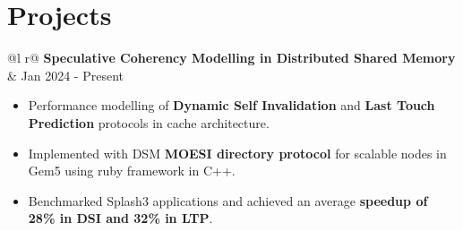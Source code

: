 \documentclass[a4paper,10pt]{article}
\begin{document}
\vspace{-0.1cm}
\section{Projects}

\begin{tabularx}{\linewidth}{ @{}l r@{} }
    \textbf{Speculative Coherency Modelling in Distributed Shared Memory} & \hfill {\small Jan 2024 - Present} \\[2.75pt]
    {
        \begin{minipage}[t]{\linewidth}
            \begin{itemize}[nosep,after=\strut, leftmargin=2em, itemsep=3pt]
                \item Performance modelling of \textbf{Dynamic Self Invalidation} and \textbf{Last Touch Prediction} protocols in cache architecture.
                \item Implemented with DSM \textbf{MOESI directory protocol} for scalable nodes in Gem5 using ruby framework in C++.
                \item Benchmarked Splash3 applications and achieved an average \textbf{speedup of 28\% in DSI and 32\% in LTP}.
            \end{itemize}
        \end{minipage}
    }  
\end{tabularx}
\vspace{0.1cm}

\end{document}
